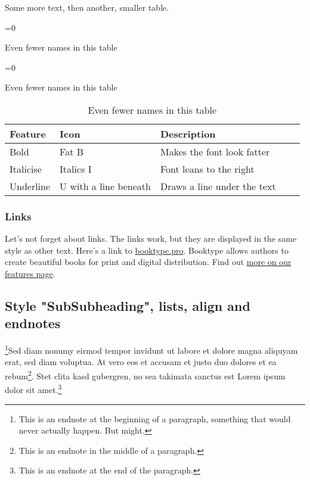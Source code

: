 Some more text, then another, smaller table. \lipsum[3]

\noindent
\begin{table}[H]
	\begin{center}
   \small
   \begin{adjustbox}{max width=\textwidth}
	\ifnum{}=0 
		\caption*{Even fewer names in this table}
	\else
		\ifnum{}=0 
			\caption*{Even fewer names in this table}
		\else
			\caption{Even fewer names in this table} 
		\fi
	\fi
		\begin{tabular}{lllll}
			\toprule
			Feature & Icon & Description \\
			\midrule
			Bold & Fat B & Makes the font look fatter \\
			Italicise & Italics I & Font leans to the right \\
			Underline & U with a line beneath & Draws a line under the text \\
			\bottomrule
		\end{tabular}
   \end{adjustbox}
	\end{center}
\end{table}

\subsubsection{Links}
Let's not forget about links. The links work, but they are displayed in the same
style as other text.
Here's a link to \href{https://booktype.pro/}{booktype.pro}. 
Booktype allows authors to create beautiful books for print and digital
distribution. Find out 
\href{https://booktype.pro/en/booktype/screenshots/}{more on our
features page}.

\lipsum[3]

\subsection{Style "SubSubheading", lists, align and endnotes}
\footnote{This is an endnote at the beginning
of a paragraph, something that would never actually happen. But
might.}Sed diam
nonumy eirmod tempor invidunt ut labore et dolore magna aliquyam
erat, sed diam voluptua. At vero eos et accusam et justo duo
dolores et ea rebum\footnote{This is an endnote in the middle of
a paragraph.}. Stet clita kasd gubergren, no sea takimata
sanctus est Lorem ipsum dolor sit amet.\footnote{This is an endnote at the end of the
paragraph.}

